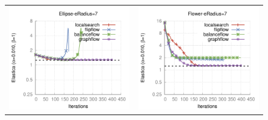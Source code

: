 \begin{figure}
\begin{tabular}{cc}
\includegraphics[scale=0.45]{figures/chapter9/free-elastica/plots/iteration/main_experiment/len_pen_0.01/radius-7/ellipse.pdf} &
\includegraphics[scale=0.45]{figures/chapter9/free-elastica/plots/iteration/main_experiment/len_pen_0.01/radius-7/flower.pdf}\\[1em]

\end{tabular}
\end{figure}
